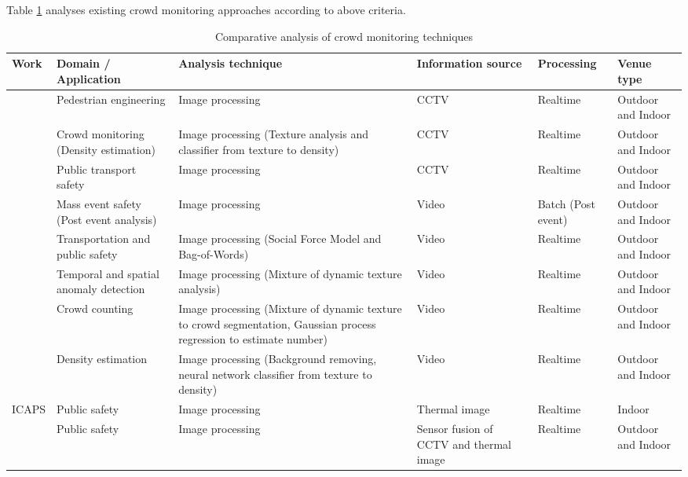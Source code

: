 Table \ref{table:crowdMonitoringTechAnalysis} analyses existing crowd monitoring approaches according to above criteria.

\begin{center}
	\begin{longtable}{|p{2cm}|p{2.5cm}|p{2.5cm}|p{2cm}|p{1.5cm}|p{2cm}|}
		\caption{Comparative analysis of crowd monitoring techniques}
		\label{table:crowdMonitoringTechAnalysis} \\
		\hline
		\textbf{Work} & \textbf{Domain / Application} & \textbf{Analysis technique} & \textbf{Information source} & \textbf{Processing} & \textbf{Venue type} \\
		\hline \hline
		\citet{Davies1995} & Pedestrian engineering & Image processing & CCTV & Realtime & Outdoor and Indoor \\
		\hline
		\citet{Marana1997} & Crowd monitoring (Density estimation) & Image processing (Texture analysis and classifier from texture to density) & CCTV & Realtime & Outdoor and Indoor \\
		\hline
		\citet{Velastin1999} & Public transport safety & Image processing & CCTV & Realtime & Outdoor and Indoor \\
		\hline
		\citet{Johansson2008} & Mass event safety (Post event analysis) & Image processing & Video & Batch (Post event) & Outdoor and Indoor \\
		\hline
		\citet{Mehran2009} & Transportation and public safety & Image processing (Social Force Model and Bag-of-Words) & Video & Realtime & Outdoor and Indoor \\
		\hline
		\citet{Mahadevan2010} & Temporal and spatial anomaly detection & Image processing (Mixture of dynamic texture analysis) & Video & Realtime & Outdoor and Indoor \\
		\hline
		\citet{Chan2008} & Crowd counting & Image processing (Mixture of dynamic texture to crowd segmentation, Gaussian process regression to estimate number) & Video & Realtime & Outdoor and Indoor \\
		\hline
		\citet{Li2010} & Density estimation & Image processing (Background removing, neural network classifier from texture to density) & Video & Realtime & Outdoor and Indoor \\
		\hline
		ICAPS \citep{Pham2007} & Public safety & Image processing & Thermal image & Realtime & Indoor \\
		\hline
		\citet{Andersson2009} & Public safety & Image processing & Sensor fusion of CCTV and thermal image & Realtime & Outdoor and Indoor \\

\end{longtable}
\end{center}
